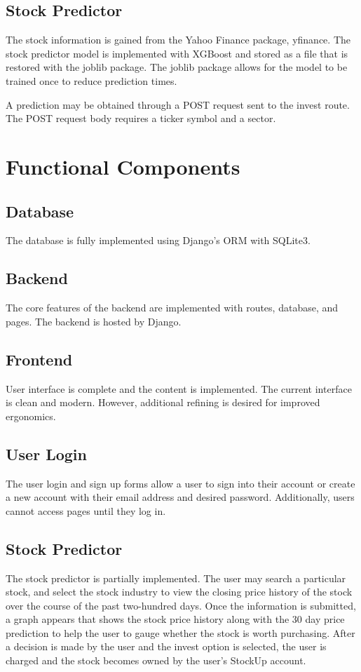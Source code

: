 \documentclass[11pt]{article}
\begin{document}
    \subsection{Stock Predictor}
    The stock information is gained from the Yahoo Finance package, yfinance.
    The stock predictor model is implemented with XGBoost and stored as a file that is restored with the joblib package.
    The joblib package allows for the model to be trained once to reduce prediction times.

    A prediction may be obtained through a POST request sent to the invest route.
    The POST request body requires a ticker symbol and a sector.

\section{Functional Components}
    \subsection{Database}
    The database is fully implemented using Django's ORM with SQLite3.

    \subsection{Backend}
    The core features of the backend are implemented with routes, database, and pages. The backend is hosted by Django.

    \subsection{Frontend}
    User interface is complete and the content is implemented.
    The current interface is clean and modern.
    However, additional refining is desired for improved ergonomics.
    
    \subsection{User Login}
    The user login and sign up forms allow a user to sign into their account or create a new account with their
    email address and desired password. Additionally, users cannot access pages until they log in.

    \subsection{Stock Predictor}
    The stock predictor is partially implemented.
    The user may search a particular stock, and select the stock industry to view 
    the closing price history of the stock over the course of the past two-hundred days.
    Once the information is submitted, a graph appears that shows the stock price history along
    with the 30 day price prediction to help the user to gauge whether the stock
    is worth purchasing.
    After a decision is made by the user and the invest option is selected, the user is charged
    and the stock becomes owned by the user's StockUp account.
\end{document}
